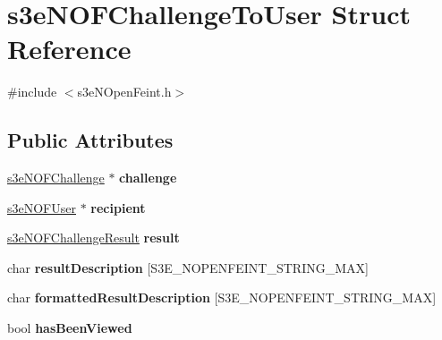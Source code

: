 \hypertarget{structs3e_n_o_f_challenge_to_user}{
\section{s3eNOFChallengeToUser Struct Reference}
\label{structs3e_n_o_f_challenge_to_user}
}


{\ttfamily \#include $<$s3eNOpenFeint.h$>$}

\subsection*{Public Attributes}
\begin{DoxyCompactItemize}
\item 
\hypertarget{structs3e_n_o_f_challenge_to_user_a64b24a4dcc0a2b7dfffed31429fb7246}{
\hyperlink{structs3e_n_o_f_challenge}{s3eNOFChallenge} $\ast$ {\bfseries challenge}}
\label{structs3e_n_o_f_challenge_to_user_a64b24a4dcc0a2b7dfffed31429fb7246}

\item 
\hypertarget{group___n_open_feint_api_group_gadb660e1877f1ba45608b5543b4a865ff}{
\hyperlink{structs3e_n_o_f_user}{s3eNOFUser} $\ast$ {\bfseries recipient}}
\label{group___n_open_feint_api_group_gadb660e1877f1ba45608b5543b4a865ff}

\item 
\hypertarget{group___n_open_feint_api_group_ga59642af50d8113fbcf9064285e7df1ea}{
\hyperlink{group___n_open_feint_api_group_ga954444cdbeafa2947e969f78ed1e29f4}{s3eNOFChallengeResult} {\bfseries result}}
\label{group___n_open_feint_api_group_ga59642af50d8113fbcf9064285e7df1ea}

\item 
\hypertarget{group___n_open_feint_api_group_gab4e3934409e9b81f9a248197c2d11abc}{
char {\bfseries resultDescription} \mbox{[}S3E\_\-NOPENFEINT\_\-STRING\_\-MAX\mbox{]}}
\label{group___n_open_feint_api_group_gab4e3934409e9b81f9a248197c2d11abc}

\item 
\hypertarget{group___n_open_feint_api_group_gad29d8e5324ec998f52efea0d9a576359}{
char {\bfseries formattedResultDescription} \mbox{[}S3E\_\-NOPENFEINT\_\-STRING\_\-MAX\mbox{]}}
\label{group___n_open_feint_api_group_gad29d8e5324ec998f52efea0d9a576359}

\item 
\hypertarget{group___n_open_feint_api_group_gacf73e9b83740e06275281e4bb9ba1c47}{
bool {\bfseries hasBeenViewed}}
\label{group___n_open_feint_api_group_gacf73e9b83740e06275281e4bb9ba1c47}


\end{DoxyCompactItemize}
